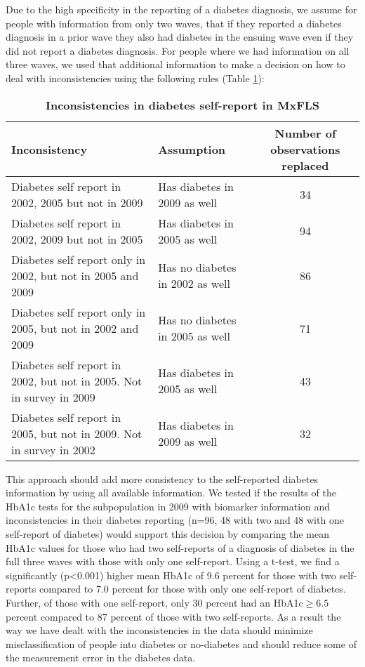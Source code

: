 Due to the high specificity in the reporting of a diabetes diagnosis,
we assume for people with information from only two waves, that if
they reported a diabetes diagnosis in a prior wave they also had diabetes
in the ensuing wave even if they did not report a diabetes diagnosis.
For people where we had information on all three waves, we used that
additional information to make a decision on how to deal with inconsistencies
using the following rules (Table \ref{tab:Inconsistencies}):

\begin{table}[h!]
\begin{center}
\begin{tabular}{llc}
Inconsistency & Assumption & Number of observations replaced\tabularnewline
\hline 
Diabetes self report in 2002, 2005 but not in 2009 & Has diabetes in 2009 as well & 34\tabularnewline
Diabetes self report in 2002, 2009 but not in 2005 & Has diabetes in 2005 as well & 94\tabularnewline
Diabetes self report only in 2002, but not in 2005 and 2009 & Has no diabetes in 2002 as well & 86\tabularnewline
Diabetes self report only in 2005, but not in 2002 and 2009 & Has no diabetes in 2005 as well & 71\tabularnewline
Diabetes self report in 2002, but not in 2005. Not in survey in 2009 & Has diabetes in 2005 as well & 43\tabularnewline
Diabetes self report in 2005, but not in 2009. Not in survey in 2002 & Has diabetes in 2009 as well & 32\tabularnewline
\hline 
\end{tabular}
\end{center}
\caption{\label{tab:Inconsistencies}\textbf{Inconsistencies in diabetes self-report in MxFLS}}
\end{table}
  

This approach should add more consistency to the self-reported diabetes
information by using all available information. We tested if the results
of the \ac{HbA1c} tests for the subpopulation in 2009 with biomarker
information and inconsistencies in their diabetes reporting (n=96,
48 with two and 48 with one self-report of diabetes) would support
this decision by comparing the mean \ac{HbA1c} values for those who
had two self-reports of a diagnosis of diabetes in the full three
waves with those with only one self-report. Using a t-test, we find
a significantly (p<0.001) higher mean \ac{HbA1c} of 9.6 percent for
those with two self-reports compared to 7.0 percent for those with
only one self-report of diabetes. Further, of those with one self-report,
only 30 percent had an \ac{HbA1c}$\geq6.5$ percent compared
to 87 percent of those with two self-reports. As a result the way
we have dealt with the inconsistencies in the data should minimize
misclassification of people into diabetes or no-diabetes and should
reduce some of the measurement error in the diabetes data. 

